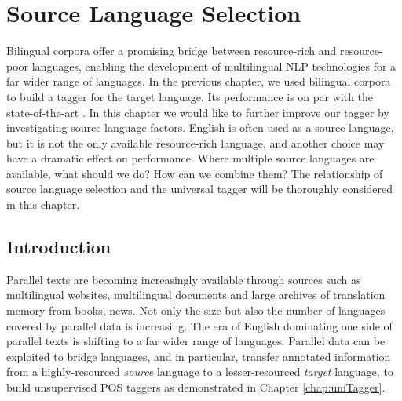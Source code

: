 
\chapter{Source Language Selection}
\label{chap:sourceLanguageSelection}

Bilingual corpora offer a promising bridge between resource-rich and resource-poor languages, enabling the development of multilingual NLP technologies for a far wider range of languages.  In the previous chapter, we used bilingual corpora to build a tagger for the target language. Its performance is on par with the state-of-the-art \cite{Das:2011}. In this chapter we would like to further improve our tagger by investigating source language factors. English is often used as a source language, but it is not the only available
resource-rich language, and another choice may have a dramatic effect
on performance. Where multiple source languages are available, what should we do? How can we combine them? The relationship of source language selection and the universal tagger will be thoroughly considered in this chapter. 

\section{Introduction}

Parallel texts are becoming increasingly available through
sources such as multilingual websites, multilingual documents and large archives of translation memory from books, news. Not only the size but also the number of languages covered by parallel data is increasing. The era of English dominating one side of parallel texts is shifting to a far wider range of languages. Parallel data can be exploited to bridge languages, and in particular, transfer annotated information from a highly-resourced \emph{source} language to a lesser-resourced
\emph{target} language, to build unsupervised POS taggers as demonstrated in Chapter  \ref{chap:uniTagger}. 

